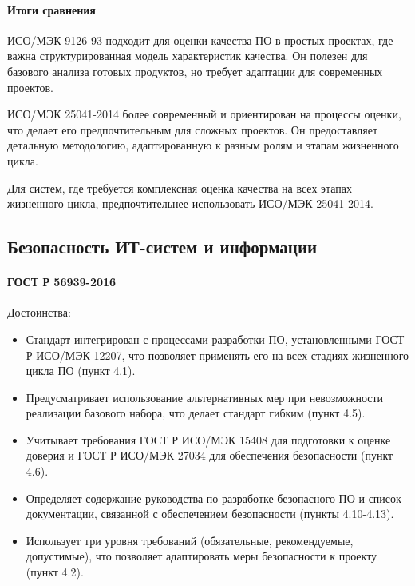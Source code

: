 \paragraph{Итоги сравнения}

ИСО/МЭК 9126-93 подходит для оценки качества ПО в простых проектах,
где важна структурированная модель характеристик качества.
Он полезен для базового анализа готовых продуктов,
но требует адаптации для современных проектов.

ИСО/МЭК 25041-2014 более современный и ориентирован на процессы оценки,
что делает его предпочтительным для сложных проектов.
Он предоставляет детальную методологию,
адаптированную к разным ролям и этапам жизненного цикла.

Для систем,
где требуется комплексная оценка качества на всех этапах жизненного цикла,
предпочтительнее использовать ИСО/МЭК 25041-2014.

\subsection{Безопасность ИТ-систем и информации}

\paragraph{ГОСТ Р 56939-2016}

Достоинства:

\begin{itemize}
	\item Стандарт интегрирован с процессами разработки ПО,
		установленными ГОСТ Р ИСО/МЭК 12207,
		что позволяет применять его
		на всех стадиях жизненного цикла ПО (пункт 4.1).
	\item Предусматривает использование альтернативных мер
		при невозможности реализации базового набора,
		что делает стандарт гибким (пункт 4.5).
	\item Учитывает требования ГОСТ Р ИСО/МЭК 15408
		для подготовки к оценке доверия и ГОСТ Р ИСО/МЭК 27034
		для обеспечения безопасности (пункт 4.6).
	\item Определяет содержание руководства по разработке безопасного ПО
		и список документации,
		связанной с обеспечением безопасности (пункты 4.10-4.13).
	\item Использует три уровня требований
		(обязательные, рекомендуемые, допустимые),
		что позволяет адаптировать меры безопасности к проекту (пункт 4.2).
\end{itemize}


